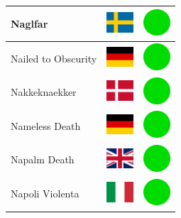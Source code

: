 \documentclass[12pt, a4paper, twoside]{report}
\begin{document}
\begin{center}
\begin{longtable}{|p{5cm}|p{2cm}|p{2cm}|}
 Naglfar                                                    & \includegraphics[width=1cm]{../img/flags/se} &   \includegraphics[width=1cm]{../likes/y} \\ \hline
 Nailed to Obscurity                                        & \includegraphics[width=1cm]{../img/flags/de} &   \includegraphics[width=1cm]{../likes/y} \\ \hline
 Nakkeknaekker                                              & \includegraphics[width=1cm]{../img/flags/dk} &   \includegraphics[width=1cm]{../likes/y} \\ \hline
 Nameless Death                                             & \includegraphics[width=1cm]{../img/flags/de} &   \includegraphics[width=1cm]{../likes/y} \\ \hline
 Napalm Death                                               & \includegraphics[width=1cm]{../img/flags/gb} &   \includegraphics[width=1cm]{../likes/y} \\ \hline
 Napoli Violenta                                            & \includegraphics[width=1cm]{../img/flags/it} &   \includegraphics[width=1cm]{../likes/y} \\ \hline

\end{longtable}
\end{center}
\end{document}
